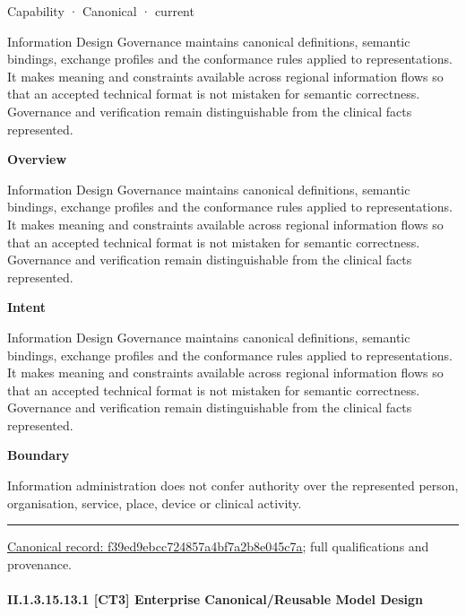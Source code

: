 \label{element:f39ed9ebcc724857a4bf7a2b8e045c7a}
{\small Capability · Canonical · current}\par

Information Design Governance maintains canonical definitions, semantic bindings, exchange profiles and the conformance rules applied to representations. It makes meaning and constraints available across regional information flows so that an accepted technical format is not mistaken for semantic correctness. Governance and verification remain distinguishable from the clinical facts represented.



\textbf{Overview}



Information Design Governance maintains canonical definitions, semantic bindings, exchange profiles and the conformance rules applied to representations. It makes meaning and constraints available across regional information flows so that an accepted technical format is not mistaken for semantic correctness. Governance and verification remain distinguishable from the clinical facts represented.



\textbf{Intent}



Information Design Governance maintains canonical definitions, semantic bindings, exchange profiles and the conformance rules applied to representations. It makes meaning and constraints available across regional information flows so that an accepted technical format is not mistaken for semantic correctness. Governance and verification remain distinguishable from the clinical facts represented.



\textbf{Boundary}



Information administration does not confer authority over the represented person, organisation, service, place, device or clinical activity.



\medskip\hrule\medskip

{\footnotesize \href{../../../../continuum/strategy/capability/f39ed9ebcc724857a4bf7a2b8e045c7a.md}{Canonical record: f39ed9ebcc724857a4bf7a2b8e045c7a}; full qualifications and provenance.}\par
\paragraph*{II.1.3.15.13.1 [CT3] Enterprise Canonical/Reusable Model Design}
\label{navigation:II.1.3.15.13.1}


